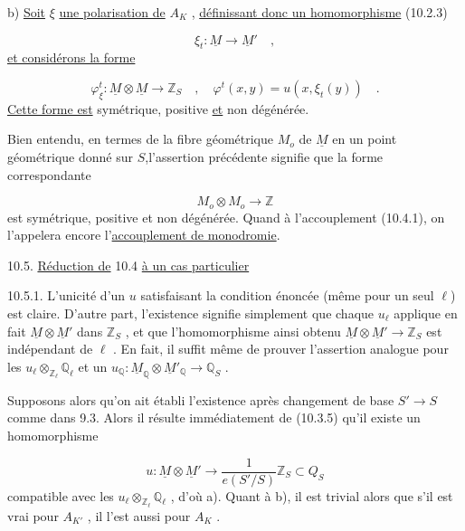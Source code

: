 b) \underline{Soit} $\xi$ \underline{une polarisation de} $A_K$ , \underline{définissant donc un homomorphisme} (10.2.3)

\begin{equation*}
\xi_t : \underline{M} \longrightarrow \underline{M}' \quad ,
\end{equation*}
\underline{et considérons la forme}

\begin{equation}\tag{10.4.2}
\varphi_\xi^t : \underline{M} \otimes \underline{M} \longrightarrow \mathbb{Z}_S \quad , \quad \varphi^t(x,y) = u(x,\xi_t(y)) \quad .
\end{equation}
\underline{Cette forme est} symétrique, positive \underline{et} non dégénérée.

Bien entendu, en termes de la fibre géométrique $M_o$ de $\underline{M}$ en un point géométrique donné sur $S$,l'assertion précédente signifie que la forme correspondante

\begin{equation*}
M_o \otimes M_o \longrightarrow \mathbb{Z}
\end{equation*}
est symétrique, positive et non dégénérée. Quand à l'accouplement (10.4.1), on l'appelera encore l'\underline{accouplement de monodromie}.




10.5. \underline{Réduction de} 10.4 \underline{à un cas particulier}

10.5.1. L'unicité d'un $u$ satisfaisant la condition énoncée (même pour un seul $\ell$) est claire. D'autre part, l'existence signifie simplement que chaque $u_\ell$ applique en fait $\underline{M} \otimes \underline{M}'$ dans $\mathbb{Z}_S$ , et que l'homomorphisme ainsi obtenu $\underline{M} \otimes \underline{M}' \longrightarrow \mathbb{Z}_S$ est indépendant de $\ell$ . En fait, il suffit même de prouver l'assertion analogue pour les $u_\ell \otimes_{\mathbb{Z}_\ell} \mathbb{Q}_\ell$ et un $u_{\mathbb{Q}} : \underline{M}_{\mathbb{Q}} \otimes \underline{M}'_{\mathbb{Q}} \longrightarrow \mathbb{Q}_S$ .

Supposons alors qu'on ait établi l'existence après changement de base $S' \longrightarrow S$ comme dans 9.3. Alors il résulte immédiatement de (10.3.5) qu'il existe un homomorphisme

\begin{equation*}
u : \underline{M} \otimes \underline{M}' \longrightarrow \frac{1}{e(S'/S)} \mathbb{Z}_S \subset Q_S
\end{equation*}
compatible avec les $u_\ell \otimes_{\mathbb{Z}_\ell} \mathbb{Q}_\ell$ , d'où a). Quant à b), il est trivial alors que s'il est vrai pour $A_{K'}$ , il l'est aussi pour $A_K$ .

